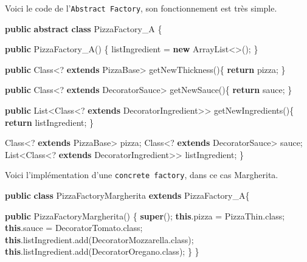 \documentclass[french,]{article}
\newenvironment{Shaded}{}{}
\newcommand{\KeywordTok}[1]{\textcolor[rgb]{0.00,0.44,0.13}{\textbf{{#1}}}}
\newcommand{\FunctionTok}[1]{\textcolor[rgb]{0.02,0.16,0.49}{{#1}}}
\newcommand{\NormalTok}[1]{{#1}}
\begin{document}
Voici le code de l'\texttt{Abstract\ Factory}, son fonctionnement est
très simple.

\begin{Shaded}
\begin{Highlighting}[]
\KeywordTok{public} \KeywordTok{abstract} \KeywordTok{class} \NormalTok{PizzaFactory_A \{}

 \KeywordTok{public} \FunctionTok{PizzaFactory_A}\NormalTok{() \{}
  \NormalTok{listIngredient = }\KeywordTok{new} \NormalTok{ArrayList<>();}
 \NormalTok{\}}

 \KeywordTok{public} \NormalTok{Class<? }\KeywordTok{extends} \NormalTok{PizzaBase> }\FunctionTok{getNewThickness}\NormalTok{()\{}
  \KeywordTok{return} \NormalTok{pizza;}
 \NormalTok{\}}

 \KeywordTok{public} \NormalTok{Class<? }\KeywordTok{extends} \NormalTok{DecoratorSauce> }\FunctionTok{getNewSauce}\NormalTok{()\{}
  \KeywordTok{return} \NormalTok{sauce;}
 \NormalTok{\}}

 \KeywordTok{public} \NormalTok{List<Class<? }\KeywordTok{extends} \NormalTok{DecoratorIngredient>> }\FunctionTok{getNewIngredients}\NormalTok{()\{}
  \KeywordTok{return} \NormalTok{listIngredient;}
 \NormalTok{\}}

 \NormalTok{Class<? }\KeywordTok{extends} \NormalTok{PizzaBase> pizza;}
 \NormalTok{Class<? }\KeywordTok{extends} \NormalTok{DecoratorSauce> sauce;}
 \NormalTok{List<Class<? }\KeywordTok{extends} \NormalTok{DecoratorIngredient>> listIngredient;}
\NormalTok{\}}
\end{Highlighting}
\end{Shaded}

Voici l'implémentation d'une \texttt{concrete\ factory}, dans ce cas
Margherita.

\begin{Shaded}
\begin{Highlighting}[]
\KeywordTok{public} \KeywordTok{class} \NormalTok{PizzaFactoryMargherita }\KeywordTok{extends} \NormalTok{PizzaFactory_A\{}

 \KeywordTok{public} \FunctionTok{PizzaFactoryMargherita}\NormalTok{() \{}
  \KeywordTok{super}\NormalTok{();}
  \KeywordTok{this}\NormalTok{.}\FunctionTok{pizza} \NormalTok{= PizzaThin.}\FunctionTok{class}\NormalTok{;}
  \KeywordTok{this}\NormalTok{.}\FunctionTok{sauce} \NormalTok{= DecoratorTomato.}\FunctionTok{class}\NormalTok{;}
  \KeywordTok{this}\NormalTok{.}\FunctionTok{listIngredient}\NormalTok{.}\FunctionTok{add}\NormalTok{(DecoratorMozzarella.}\FunctionTok{class}\NormalTok{);}
  \KeywordTok{this}\NormalTok{.}\FunctionTok{listIngredient}\NormalTok{.}\FunctionTok{add}\NormalTok{(DecoratorOregano.}\FunctionTok{class}\NormalTok{);}
 \NormalTok{\}}
\NormalTok{\}}
\end{Highlighting}
\end{Shaded}
\end{document}
